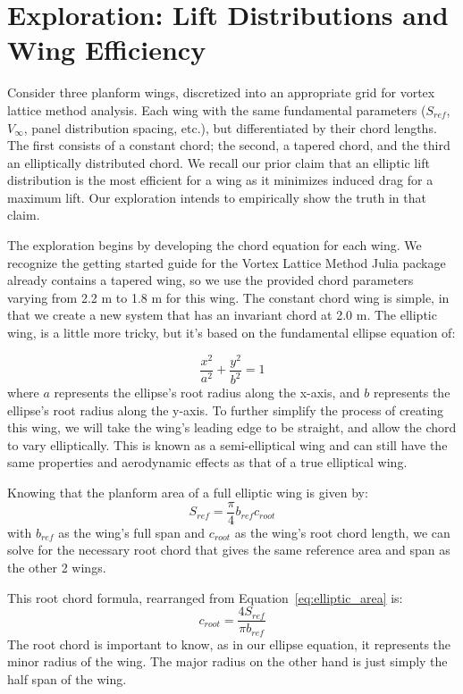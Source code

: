 \documentclass{report}
\begin{document}
\section{Exploration: Lift Distributions and Wing Efficiency}
Consider three planform wings, discretized into an appropriate grid for vortex lattice method analysis. Each wing with the same fundamental parameters ($S_{ref}$, $V_{\infty}$, panel distribution spacing, etc.), but differentiated by their chord lengths. The first
consists of a constant chord; the second, a tapered chord, and the third an elliptically distributed chord. We recall our prior claim that an elliptic lift distribution is the most efficient for a wing as it minimizes induced drag for a maximum lift. Our exploration intends
to empirically show the truth in that claim. 

The exploration begins by developing the chord equation for each wing. We recognize the getting started guide for the Vortex Lattice Method Julia package already contains a tapered wing, so we use the provided chord parameters varying from 2.2 m to 1.8 m for this wing.
The constant chord wing is simple, in that we create a new system that has an invariant chord at 2.0 m. 
The elliptic wing, is a little more tricky, but it's based on the fundamental ellipse equation of:

\begin{equation}\label{eq:ellipse}
\frac{x^2}{a^2} + \frac{y^2}{b^2} = 1
\end{equation}
where $a$ represents the ellipse's root radius along the x-axis, and $b$ represents the ellipse's root radius along the y-axis. To further simplify the process of creating this wing, we will take the wing's leading edge to be straight, and allow the chord to vary elliptically. This is known as a semi-elliptical wing and can still have the same properties and aerodynamic effects as that of a true elliptical wing.

Knowing that the planform area of a full elliptic wing is given by:
\begin{equation}\label{eq:elliptic_area}
S_{ref} = \frac{\pi}{4} b_{ref}  c_{root}
\end{equation}
with $b_{ref}$ as the wing's full span and $c_{root}$ as the wing's root chord length, we can solve for the necessary root chord that gives the same reference area and span as the other 2 wings.

This root chord formula, rearranged from Equation~\ref{eq:elliptic_area} is:
\begin{equation}\label{c_root}
c_{root} = \frac{4  S_{ref}}{\pi  b_{ref}}
\end{equation}
The root chord is important to know, as in our ellipse equation, it represents the minor radius of the wing. The major radius on the other hand is just simply the half span of the wing.
\end{document}
